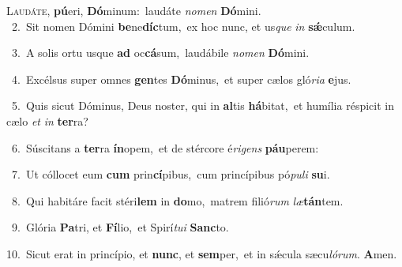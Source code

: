 \lettrine{\initial\textcolor{\initialcolor}{L}}{audáte,} \textbf{pú}\-eri, \textbf{Dó}\-minum:~\star laudáte \textit{no}\-\textit{men} \textbf{Dó}\-mini.\\
{\numbfont\textcolor{\numbcolor}{~2.}}~Sit nomen Dómini \textbf{be}\-ne\-\textbf{díc}\-tum,~\star ex hoc nunc, et us\textit{que} \textit{in} \textbf{sǽ}\-culum.\par
{\numbfont\textcolor{\numbcolor}{~3.}}~A solis ortu usque \textbf{ad} oc\-\textbf{cá}\-sum,~\star laudábile \textit{no}\-\textit{men} \textbf{Dó}\-mini.\par
{\numbfont\textcolor{\numbcolor}{~4.}}~Excélsus super omnes \textbf{gen}\-tes \textbf{Dó}\-minus,~\star et super cælos gló\-\textit{ri}\-\textit{a} \textbf{e}\-jus.\par
{\numbfont\textcolor{\numbcolor}{~5.}}~Quis sicut Dóminus, Deus noster, qui in \textbf{al}\-tis \textbf{há}\-bitat,~\star et humília réspicit in cælo \textit{et} \textit{in} \textbf{ter}\-ra?\par
{\numbfont\textcolor{\numbcolor}{~6.}}~Súscitans a \textbf{ter}\-ra \textbf{ín}\-opem,~\star et de stércore é\-\textit{ri}\-\textit{gens} \textbf{páu}\-perem:\par
{\numbfont\textcolor{\numbcolor}{~7.}}~Ut cóllocet eum \textbf{cum} prin\-\textbf{cí}\-pibus,~\star cum princípibus pó\-\textit{pu}\-\textit{li} \textbf{su}\-i.\par
{\numbfont\textcolor{\numbcolor}{~8.}}~Qui habitáre facit stéri\textbf{lem} in \textbf{do}\-mo,~\star matrem filió\textit{rum} \textit{læ}\-\textbf{tán}tem.\par
{\numbfont\textcolor{\numbcolor}{~9.}}~Glória \textbf{Pa}\-tri, et \textbf{Fí}\-lio,~\star et Spirí\-\textit{tu}\-\textit{i} \textbf{Sanc}\-to.\par
{\numbfont\textcolor{\numbcolor}{10.}}~Sicut erat in princípio, et \textbf{nunc}\-, et \textbf{sem}\-per,~\star et in sǽcula sæcu\-\textit{ló}\-\textit{rum}. \textbf{A}\-men.\par
